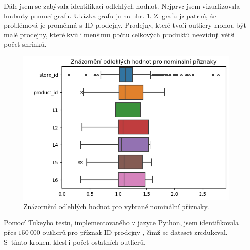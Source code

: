 
Dále jsem se zabývala identifikací odlehlých hodnot. Nejprve jsem vizualizovala hodnoty pomocí grafu. Ukázka grafu je na obr. \ref*{obr:rok:g:outlierN}. Z~grafu je patrné, že problémová je proměnná s~ID prodejny. Prodejny, které tvoří outliery mohou být malé prodejny, které kvůli menšímu počtu celkových produktů neevidují větší počet shrinků. %

\begin{figure}[hbtp!]
        \centering
        \captionsetup{justification=centering}
        
        \includegraphics[width=.6\textwidth]{obrazky/zntb/box_nominal.png}
        \caption{Znázornění odlehlých hodnot pro vybrané nominální příznaky.}
        \label{obr:rok:g:outlierN}

\end{figure}

Pomocí Tukeyho testu, implementovaného v jazyce Python, jsem identifikovala přes $150\ 000$ outlierů pro příznak ID prodejny %
, čímž se dataset zredukoval. S~tímto krokem klesl i počet ostatních outlierů.

